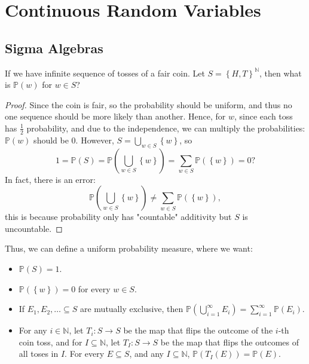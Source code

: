 \chapter{Continuous Random Variables}
\section{Sigma Algebras}
\begin{eg}
    If we have infinite sequence of tosses of a fair coin. Let \(S = \left\{ H, T \right\}^{\mathbb{N}} \), then what is \(\mathbb{P} (w)\) for \(w \in S\)?   
\end{eg}
\begin{proof}
    Since the coin is fair, so the probability should be uniform, and thus no one sequence should be more likely than another. Hence, for \(w\), since each toss has \(\frac{1}{2}\) probability, and due to the independence, we can multiply the probabilities: \(\mathbb{P} (w)\) should be \(0\). However, \(S = \bigcup_{w \in S} \left\{ w \right\}  \), so 
    \[
        1 = \mathbb{P} (S) = \mathbb{P} \left( \bigcup_{w \in S} \left\{ w \right\}   \right) = \sum_{w \in S} \mathbb{P} \left( \left\{ w \right\}  \right) = 0 ?   
    \]    
    In fact, there is an error:
    \[
        \mathbb{P} \left( \bigcup_{w \in S} \left\{ w \right\}   \right) \neq \sum_{w \in S} \mathbb{P} (\left\{ w \right\} ),  
    \]
    this is because probability only has "countable" additivity but \(S\) is uncountable. 
\end{proof}

Thus, we can define a uniform probability measure, where we want:
\begin{itemize}
    \item [(1)] \(\mathbb{P} (S) = 1\). 
    \item [(2)] \(\mathbb{P} (\left\{ w \right\} ) = 0\) for every \(w \in S\). 
    \item [(3)] If \(E_1, E_2, \dots \subseteq S\) are mutually exclusive, then \(\mathbb{P} \left( \bigcup_{i=1}^{\infty} E_i  \right) = \sum_{i=1}^{\infty} \mathbb{P} (E_i)  \). 
    \item [(4)] For any \(i \in \mathbb{N} \), let \(T_i : S \to S\) be the map that flips the outcome of the \(i\)-th coin toss, and for \(I \subseteq \mathbb{N}\), let \(T_I: S \to S\) be the map that flips the outcomes of all toses in \(I\). For every \(E \subseteq S\), and any \(I \subseteq \mathbb{N}\), \(\mathbb{P} (T_I(E))= \mathbb{P} (E)\).              
\end{itemize}

